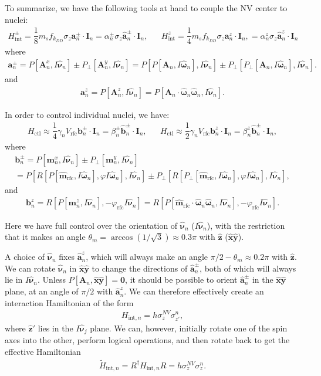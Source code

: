 \documentclass[11pt]{article}
\renewcommand{\t}{\text} %
\newcommand{\f}[2]{\dfrac{#1}{#2}} %
\newcommand{\p}[1]{\left(#1\right)} %
\renewcommand{\sp}[1]{\left[#1\right]} %
\renewcommand{\v}{\bm} %
\newcommand{\uv}[1]{\hat{\v{#1}}} %
\renewcommand{\c}{\cdot} %
\renewcommand{\phi}{\varphi} %
\begin{document}
To summarize, we have the following tools at hand to couple the NV
center to nuclei:
\begin{align}
  H_{\t{int}}^\pm=\f18m_sf_{k_{DD}}\sigma_z\v a_n^\pm\c\v I_n
  =\alpha_n^\pm\sigma_z\uv a_n^\pm\c\v I_n, &&
  H_{\t{int}}^z=\f14m_sf_{k_{DD}}\sigma_z\v a_n^z\c\v I_n,
  =\alpha_n^z\sigma_z\uv a_n^z\c\v I_n
\end{align}
where
\begin{align}
  \v a_n^\pm=P\sp{\v A_n^x,I\uv\nu_n}\pm P_\perp\sp{\v
    A_n^y,I\uv\nu_n} =P\sp{P\sp{\v A_n,I\uv\omega_n},I\uv\nu_n}\pm
  P_\perp\sp{P_\perp\sp{\v A_n,I\uv\omega_n},I\uv\nu_n}.
\end{align}
and
\begin{align}
  \v a_n^z=P\sp{\v A_n^z,I\uv\nu_n} =P\sp{\v
    A_n\c\uv\omega_n\uv\omega_n,I\uv\nu_n}.
\end{align}

In order to control individual nuclei, we have:
\begin{align}
  H_{\t{ctl}}\approx\f14\gamma_nV_{\t{rfc}}\v b_n^\pm\c\v I_n
  =\beta_n^\pm\uv b_n^\pm\c\v I_n, &&
  H_{\t{ctl}}\approx\f12\gamma_nV_{\t{rfc}}\v b_n^z\c\v I_n
  =\beta_n^z\uv b_n^\pm\c\v I_n,
\end{align}
where
\begin{multline}
  \v b_n^\pm=P\sp{\v m_n^x,I\uv\nu_n}\pm P_\perp\sp{\v m_n^y,
    I\uv\nu_n} \\
  =P\sp{R\sp{P\sp{\uv m_{\t{rfc}},I\uv\omega_n}, \phi
      I\uv\omega_n},I\uv\nu_n}\pm P_\perp\sp{R\sp{P_\perp\sp{\uv
        m_{\t{rfc}},I\uv\omega_n},\phi I\uv\omega_n},I\uv\nu_n},
\end{multline}
and
\begin{align}
  \v b_n^z=R\sp{P\sp{\v m_n^z,I\uv\nu_n},-\phi_{\t{rfc}}I\uv\nu_n}
  =R\sp{P\sp{\uv m_{\t{rfc}}\c\uv\omega_n\uv\omega_n,I\uv\nu_n},
    -\phi_{\t{rfc}}I\uv\nu_n}.
\end{align}

Here we have full control over the orientation of $\uv\nu_n$
($I\uv\nu_n$), with the restriction that it makes an angle
$\theta_m=\arccos\p{1/\sqrt3}\approx0.3\pi$ with $\uv z$ ($\uv x\uv
y$).

A choice of $\uv\nu_n$ fixes $\uv a_n^z$, which will always make an
angle $\pi/2-\theta_m\approx0.2\pi$ with $\uv z$. We can rotate
$\uv\nu_n$ in $\uv x\uv y$ to change the directions of $\uv a_n^\pm$,
both of which will always lie in $I\uv\nu_n$. Unless $P\sp{\v A_n,\uv
  x\uv y}=\v 0$, it should be possible to orient $\uv a_n^\pm$ in the
$\uv x\uv y$ plane, at an angle of $\pi/2$ with $\uv a_n^z$. We can
therefore effectively create an interaction Hamiltonian of the form
\begin{align}
  H_{\t{int},n}=h\sigma_z^{NV}\sigma_{z'}^n,
\end{align}
where $\uv z'$ lies in the $I\uv\nu_j$ plane. We can, however,
initially rotate one of the spin axes into the other, perform logical
operations, and then rotate back to get the effective Hamiltonian
\begin{align}
  \tilde H_{\t{int},n}=R^\dagger
  H_{\t{int},n}R=h\sigma_z^{NV}\sigma_z^n.
\end{align}
\end{document}
